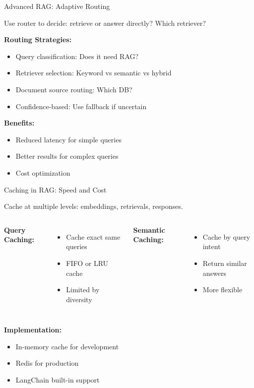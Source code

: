 \documentclass[aspectratio=169,11pt]{beamer}
\begin{document}
\begin{frame}{Advanced RAG: Adaptive Routing}
  \begin{conceptbox}
    Use router to decide: retrieve or answer directly? Which retriever?
  \end{conceptbox}

  \textbf{Routing Strategies:}
  \begin{itemize}
    \setlength{\itemsep}{1pt}
    \item Query classification: Does it need RAG?
    \item Retriever selection: Keyword vs semantic vs hybrid
    \item Document source routing: Which DB?
    \item Confidence-based: Use fallback if uncertain
  \end{itemize}

  \textbf{Benefits:}
  \begin{itemize}
    \setlength{\itemsep}{1pt}
    \item Reduced latency for simple queries
    \item Better results for complex queries
    \item Cost optimization
  \end{itemize}
\end{frame}

\begin{frame}{Caching in RAG: Speed and Cost}
  \begin{tipbox}[Opportunities]
    Cache at multiple levels: embeddings, retrievals, responses.
  \end{tipbox}

  \begin{columns}[T]
    \textbf{Query Caching:}
    \begin{itemize}
    \setlength{\itemsep}{1pt}
      \item Cache exact same queries
      \item FIFO or LRU cache
      \item Limited by diversity
    \end{itemize}

    \textbf{Semantic Caching:}
    \begin{itemize}
    \setlength{\itemsep}{1pt}
      \item Cache by query intent
      \item Return similar answers
      \item More flexible
    \end{itemize}
  \end{columns}

  \textbf{Implementation:}
  \begin{itemize}
    \setlength{\itemsep}{1pt}
    \item In-memory cache for development
    \item Redis for production
    \item LangChain built-in support
  \end{itemize}
\end{frame}
\end{document}

